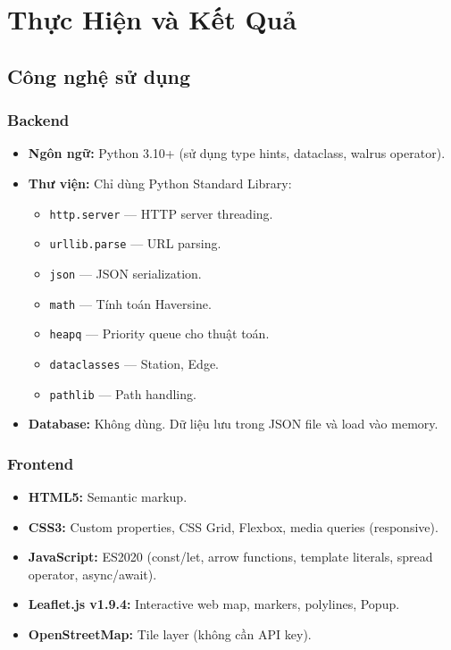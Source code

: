 
\chapter{Thực Hiện và Kết Quả}

\section{Công nghệ sử dụng}

\subsection{Backend}

\begin{itemize}
  \item \textbf{Ngôn ngữ:} Python 3.10+ (sử dụng type hints, dataclass, walrus operator).
  \item \textbf{Thư viện:} Chỉ dùng Python Standard Library:
    \begin{itemize}
      \item \texttt{http.server} --- HTTP server threading.
      \item \texttt{urllib.parse} --- URL parsing.
      \item \texttt{json} --- JSON serialization.
      \item \texttt{math} --- Tính toán Haversine.
      \item \texttt{heapq} --- Priority queue cho thuật toán.
      \item \texttt{dataclasses} --- Station, Edge.
      \item \texttt{pathlib} --- Path handling.
    \end{itemize}
  \item \textbf{Database:} Không dùng. Dữ liệu lưu trong JSON file và load vào memory.
\end{itemize}

\subsection{Frontend}

\begin{itemize}
  \item \textbf{HTML5:} Semantic markup.
  \item \textbf{CSS3:} Custom properties, CSS Grid, Flexbox, media queries (responsive).
  \item \textbf{JavaScript:} ES2020 (const/let, arrow functions, template literals, spread operator, async/await).
  \item \textbf{Leaflet.js v1.9.4:} Interactive web map, markers, polylines, Popup.
  \item \textbf{OpenStreetMap:} Tile layer (không cần API key).
\end{itemize}

